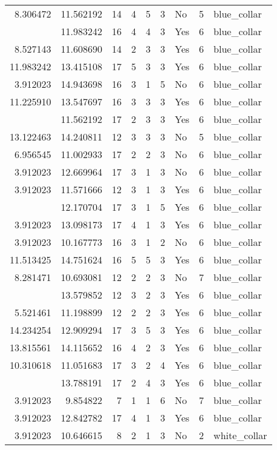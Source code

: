 \documentclass[
]{article}
\begin{document}
\begin{longtable}[t]{rrrrrllrl}
8.306472 & 11.562192 & 14 & 4 & 5 & 3 & No & 5 & blue\_collar\\
\addlinespace
8.968269 & 11.983242 & 16 & 4 & 4 & 3 & Yes & 6 & blue\_collar\\
8.527143 & 11.608690 & 14 & 2 & 3 & 3 & Yes & 6 & blue\_collar\\
11.983242 & 13.415108 & 17 & 5 & 3 & 3 & Yes & 6 & blue\_collar\\
3.912023 & 14.943698 & 16 & 3 & 1 & 5 & No & 6 & blue\_collar\\
11.225910 & 13.547697 & 16 & 3 & 3 & 3 & Yes & 6 & blue\_collar\\
\addlinespace
11.290407 & 11.562192 & 17 & 2 & 3 & 3 & Yes & 6 & blue\_collar\\
13.122463 & 14.240811 & 12 & 3 & 3 & 3 & No & 5 & blue\_collar\\
6.956545 & 11.002933 & 17 & 2 & 2 & 3 & No & 6 & blue\_collar\\
3.912023 & 12.669964 & 17 & 3 & 1 & 3 & No & 6 & blue\_collar\\
3.912023 & 11.571666 & 12 & 3 & 1 & 3 & Yes & 6 & blue\_collar\\
\addlinespace
3.912023 & 12.170704 & 17 & 3 & 1 & 5 & Yes & 6 & blue\_collar\\
3.912023 & 13.098173 & 17 & 4 & 1 & 3 & Yes & 6 & blue\_collar\\
3.912023 & 10.167773 & 16 & 3 & 1 & 2 & No & 6 & blue\_collar\\
11.513425 & 14.751624 & 16 & 5 & 5 & 3 & Yes & 6 & blue\_collar\\
8.281471 & 10.693081 & 12 & 2 & 2 & 3 & No & 7 & blue\_collar\\
\addlinespace
5.347107 & 13.579852 & 12 & 3 & 2 & 3 & Yes & 6 & blue\_collar\\
5.521461 & 11.198899 & 12 & 2 & 2 & 3 & Yes & 6 & blue\_collar\\
14.234254 & 12.909294 & 17 & 3 & 5 & 3 & Yes & 6 & blue\_collar\\
13.815561 & 14.115652 & 16 & 4 & 2 & 3 & Yes & 6 & blue\_collar\\
10.310618 & 11.051683 & 17 & 3 & 2 & 4 & Yes & 6 & blue\_collar\\
\addlinespace
12.577809 & 13.788191 & 17 & 2 & 4 & 3 & Yes & 6 & blue\_collar\\
3.912023 & 9.854822 & 7 & 1 & 1 & 6 & No & 7 & blue\_collar\\
3.912023 & 12.842782 & 17 & 4 & 1 & 3 & Yes & 6 & blue\_collar\\
3.912023 & 10.646615 & 8 & 2 & 1 & 3 & No & 2 & white\_collar\\

\end{longtable}
\end{document}

